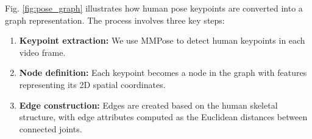 \documentclass[conference]{IEEEtran}
\begin{document}
Fig. \ref{fig:pose_graph} illustrates how human pose keypoints are converted into a graph representation. The process involves three key steps:

\begin{enumerate}
    \item \textbf{Keypoint extraction:} We use MMPose to detect human keypoints in each video frame.
    \item \textbf{Node definition:} Each keypoint becomes a node in the graph with features representing its 2D spatial coordinates.
    \item \textbf{Edge construction:} Edges are created based on the human skeletal structure, with edge attributes computed as the Euclidean distances between connected joints.
\end{enumerate}
\end{document}
